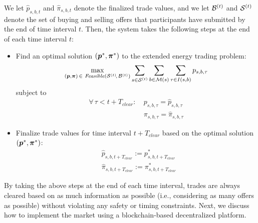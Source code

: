 We let $\hat{p}_{s,b,t}$ and $\hat{\pi}_{s,b,t}$ denote the finalized trade values, and we let $\mathcal{B}^{(t)}$ and $\mathcal{S}^{(t)}$ denote the set of buying and selling offers that participants have submitted by the end of time interval $t$.
Then, the system takes the following steps at the end of each time interval $t$:
\begin{itemize}
\item Find an optimal solution $(\boldsymbol{p}^*, \boldsymbol{\pi}^*)$ to the extended energy trading problem:
\begin{equation}
\max_{(\boldsymbol{p}, \boldsymbol{\pi}) \, \in \textit{ Feasible}(\mathcal{S}^{(t)}\!,\, \mathcal{B}^{(t)})} \sum_{s \in \mathcal{S}^{(t)}} \sum_{b \in \mathcal{M}(s)} \sum_{\tau \in I(s,b)} p_{s,b,\tau}
\end{equation}
subject to
\begin{align}
\forall \, \tau < t + T_{clear}\!: ~ & p_{s,b,\tau} = \hat{p}_{s,b,\tau} \\ %
& \pi_{s,b,\tau} = \hat{\pi}_{s,b,\tau} 
\end{align}
\item Finalize trade values for time interval $t + T_{clear}$ based on the optimal solution $(\boldsymbol{p}^*, \boldsymbol{\pi}^*)$:
\begin{align}
& \hat{p}_{s,b,t + T_{clear}} := p^*_{s,b,t + T_{clear}} \\ 
& \hat{\pi}_{s,b,t + T_{clear}} := \pi^*_{s,b,t + T_{clear}} 
\end{align}
\end{itemize}

By taking the above steps at the end of each time interval, trades are always cleared based on as much information as possible (i.e., considering as many offers as possible) without violating any safety or timing constraints.
Next, we discuss how to implement the market using a blockchain-based decentralized platform.



